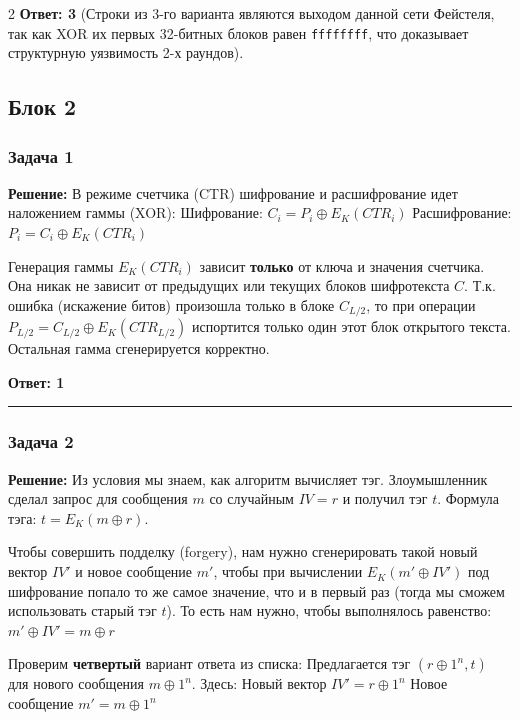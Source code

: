 ﻿\documentclass[10pt,a4paper,landscape]{extarticle}
\begin{document}
\begin{multicols*}{2}
\textbf{Ответ: 3} (Строки из 3-го варианта являются выходом данной сети Фейстеля, так как XOR их первых 32-битных блоков равен \texttt{ffffffff}, что доказывает структурную уязвимость 2-х раундов).

\subsection{Блок 2}\label{ux431ux43bux43eux43a-2}

\subsubsection{Задача 1}\label{ux437ux430ux434ux430ux447ux430-1}

\textbf{Решение:} В режиме счетчика (CTR) шифрование и расшифрование идет наложением гаммы (XOR): Шифрование: \(C_i = P_i \oplus E_K(CTR_i)\) Расшифрование: \(P_i = C_i \oplus E_K(CTR_i)\)

Генерация гаммы \(E_K(CTR_i)\) зависит \textbf{только} от ключа и значения счетчика. Она никак не зависит от предыдущих или текущих блоков шифротекста \(C\). Т.к. ошибка (искажение битов) произошла только в блоке \(C_{L/2}\), то при операции \(P_{L/2} = C_{L/2} \oplus E_K(CTR_{L/2})\) испортится только один этот блок открытого текста. Остальная гамма сгенерируется корректно.

\textbf{Ответ: 1}

\begin{center}\rule{0.5\linewidth}{0.5pt}\end{center}

\subsubsection{Задача 2}\label{ux437ux430ux434ux430ux447ux430-2}

\textbf{Решение:} Из условия мы знаем, как алгоритм вычисляет тэг. Злоумышленник сделал запрос для сообщения \(m\) со случайным \(IV = r\) и получил тэг \(t\). Формула тэга: \(t = E_K(m \oplus r)\).

Чтобы совершить подделку (forgery), нам нужно сгенерировать такой новый вектор \(IV'\) и новое сообщение \(m'\), чтобы при вычислении \(E_K(m' \oplus IV')\) под шифрование попало то же самое значение, что и в первый раз (тогда мы сможем использовать старый тэг \(t\)). То есть нам нужно, чтобы выполнялось равенство: \(m' \oplus IV' = m \oplus r\)

Проверим \textbf{четвертый} вариант ответа из списка: Предлагается тэг \textbf{\((r \oplus 1^n, t)\)} для нового сообщения \textbf{\(m \oplus 1^n\)}. Здесь: Новый вектор \(IV' = r \oplus 1^n\) Новое сообщение \(m' = m \oplus 1^n\)


\end{multicols*}
\end{document}
